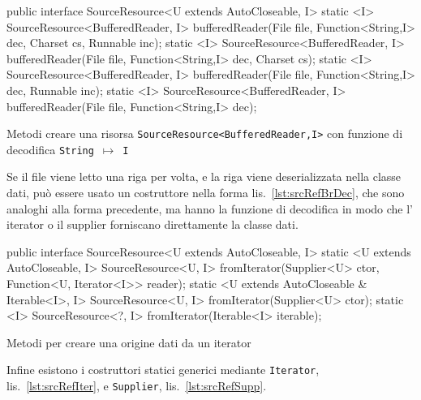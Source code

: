 \begin{elisting}[!htb]
\begin{javacode}
public interface SourceResource<U extends AutoCloseable, I> {
    static <I> SourceResource<BufferedReader, I> bufferedReader(File file, Function<String,I> dec,
                                                                Charset cs, Runnable inc);
    static <I> SourceResource<BufferedReader, I> bufferedReader(File file, Function<String,I> dec, Charset cs);
    static <I> SourceResource<BufferedReader, I> bufferedReader(File file, Function<String,I> dec, Runnable inc);
    static <I> SourceResource<BufferedReader, I> bufferedReader(File file, Function<String,I> dec);
}
\end{javacode}
\caption[Metodi creare una risorsa \texttt{SourceResource<BufferedReader,I>}
con funzione di decodifica]{Metodi creare una risorsa \texttt{SourceResource<BufferedReader,I>}
con funzione di decodifica \texttt{String}~$\mapsto$~\texttt{I}}
\label{lst:srcRefBrDec}
\end{elisting}
Se il file viene letto una riga per volta, e la riga viene deserializzata nella
classe dati, può essere usato un costruttore nella forma
lis.~\ref{lst:srcRefBrDec}, che sono analoghi alla forma precedente, ma hanno
la funzione di decodifica in modo che l'\,iterator o il supplier forniscano
direttamente la classe dati.

\begin{elisting}[!htb]
\begin{javacode}
public interface SourceResource<U extends AutoCloseable, I> {
    static <U extends AutoCloseable, I> SourceResource<U, I> fromIterator(Supplier<U> ctor,
                                                                          Function<U, Iterator<I>> reader);
    static <U extends AutoCloseable & Iterable<I>, I> SourceResource<U, I> fromIterator(Supplier<U> ctor);
    static <I> SourceResource<?, I> fromIterator(Iterable<I> iterable);
}
\end{javacode}
\caption{Metodi per creare una origine dati da un iterator}
\label{lst:srcRefIter}
\end{elisting}
Infine esistono i costruttori statici generici mediante \texttt{Iterator},
lis.~\ref{lst:srcRefIter}, e \texttt{Supplier}, lis.~\ref{lst:srcRefSupp}.

